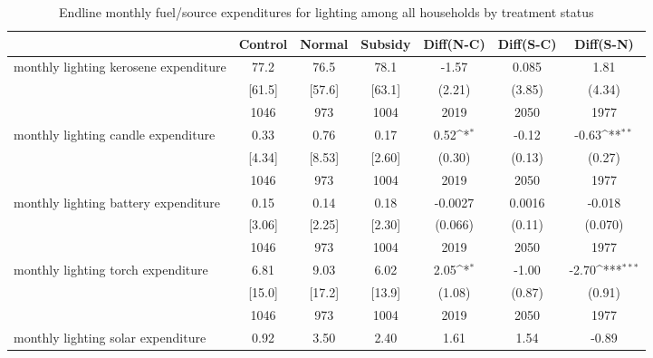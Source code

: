 \begin{table}[htbp]\centering
\def\sym#1{\ifmmode^{#1}\else\(^{#1}\)\fi}
\caption{Endline monthly fuel/source expenditures for lighting among all households by treatment status \label{tab:"balance"}}
\begin{tabular*}{1\hsize}{@{\hskip\tabcolsep\extracolsep\fill}l*{1}{cccccc}}
\toprule
                                &  Control&   Normal&  Subsidy&Diff(N-C)         &Diff(S-C)         &Diff(S-N)         \\
\midrule
monthly lighting kerosene expenditure&     77.2&     76.5&     78.1&    -1.57         &    0.085         &     1.81         \\
                                &   [61.5]&   [57.6]&   [63.1]&   (2.21)         &   (3.85)         &   (4.34)         \\
                                &     1046&      973&     1004&     2019         &     2050         &     1977         \\
monthly lighting candle expenditure&     0.33&     0.76&     0.17&     0.52\sym{*}  &    -0.12         &    -0.63\sym{**} \\
                                &   [4.34]&   [8.53]&   [2.60]&   (0.30)         &   (0.13)         &   (0.27)         \\
                                &     1046&      973&     1004&     2019         &     2050         &     1977         \\
monthly lighting battery expenditure&     0.15&     0.14&     0.18&  -0.0027         &   0.0016         &   -0.018         \\
                                &   [3.06]&   [2.25]&   [2.30]&  (0.066)         &   (0.11)         &  (0.070)         \\
                                &     1046&      973&     1004&     2019         &     2050         &     1977         \\
monthly lighting torch expenditure&     6.81&     9.03&     6.02&     2.05\sym{*}  &    -1.00         &    -2.70\sym{***}\\
                                &   [15.0]&   [17.2]&   [13.9]&   (1.08)         &   (0.87)         &   (0.91)         \\
                                &     1046&      973&     1004&     2019         &     2050         &     1977         \\
monthly lighting solar expenditure&     0.92&     3.50&     2.40&     1.61         &     1.54         &    -0.89         \\

\end{tabular*}
\end{table}

